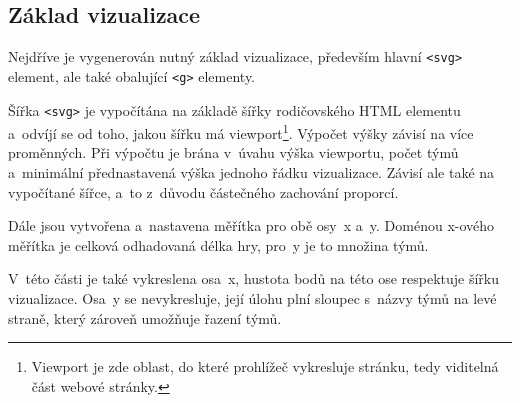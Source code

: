 \documentclass[
  digital, %
  oneside, %
  table,   %
  nolof,     %
  nolot,     %
]{fithesis3}
\begin{document}

\subsection{Základ vizualizace}
Nejdříve je vygenerován nutný základ vizualizace, především hlavní \verb|<svg>| element, ale také obalující \verb|<g>| elementy.\par
Šířka \verb|<svg>| je vypočítána na základě šířky rodičovského HTML elementu a~odvíjí se od toho, jakou šířku má viewport\footnote{Viewport je zde oblast, do které prohlížeč vykresluje stránku, tedy viditelná část webové stránky.}. Výpočet výšky závisí na více proměnných. Při výpočtu je brána v~úvahu výška viewportu, počet týmů a~minimální přednastavená výška jednoho řádku vizualizace. Závisí ale také na vypočítané šířce, a~to z~důvodu částečného zachování proporcí.\par
Dále jsou vytvořena a~nastavena měřítka pro obě osy~x a~y. Doménou x-ového měřítka je celková odhadovaná délka hry, pro~y je to množina týmů.\par
V~této části je také vykreslena osa~x, hustota bodů na této ose respektuje šířku vizualizace. Osa~y se nevykresluje, její úlohu plní sloupec s~názvy týmů na levé straně, který zároveň umožňuje řazení týmů.
\end{document}
